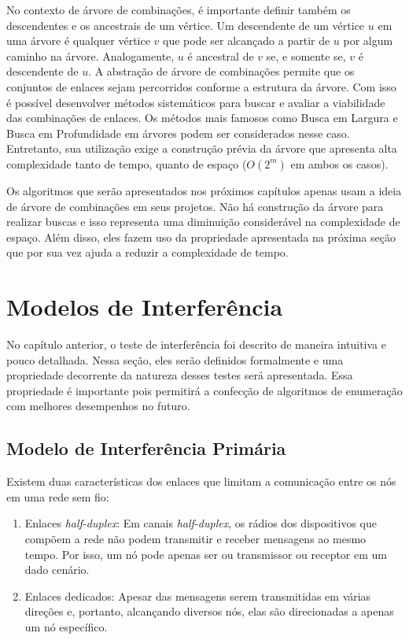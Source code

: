 

No contexto de árvore de combinações, é importante definir também os descendentes e os ancestrais de um vértice. Um descendente de um vértice $u$ em uma árvore é qualquer vértice $v$ que pode ser alcançado a partir de $u$ por algum caminho na árvore. Analogamente, $u$ é ancestral de $v$ se, e somente se, $v$ é descendente de $u$. 
A abstração de árvore de combinações permite que os conjuntos de enlaces sejam percorridos conforme a estrutura da árvore. Com isso é possível desenvolver métodos sistemáticos para buscar e avaliar a viabilidade das combinações de enlaces. Os métodos mais famosos como Busca em Largura e Busca em Profundidade em árvores podem ser considerados nesse caso. Entretanto, sua utilização exige a construção prévia da árvore que apresenta alta complexidade tanto de tempo, quanto de espaço ($O(2^m)$ em ambos os casos).

Os algoritmos que serão apresentados nos próximos capítulos apenas usam a ideia de árvore de combinações em seus projetos. Não há construção da árvore para realizar buscas e isso representa uma diminuição considerável na complexidade de espaço. Além disso, eles fazem uso da propriedade apresentada na próxima seção que por sua vez ajuda a reduzir a complexidade de tempo.


\section{Modelos de Interferência}

No capítulo anterior, o teste de interferência foi descrito de maneira intuitiva e pouco detalhada. Nessa seção, eles serão definidos formalmente e uma propriedade decorrente da natureza desses testes será apresentada. Essa propriedade é importante pois permitirá a confecção de algoritmos de enumeração com melhores desempenhos no futuro. 

\subsection{Modelo de Interferência Primária}

Existem duas características dos enlaces que limitam a comunicação entre os nós em uma rede sem fio: 


\begin{enumerate}

\item Enlaces {\it half-duplex}: Em canais {\it half-duplex}, os rádios dos dispositivos que compõem a rede não podem transmitir e receber mensagens ao mesmo tempo. Por isso, um nó pode apenas ser ou transmissor ou receptor em um dado cenário.
 
\item Enlaces dedicados: Apesar das mensagens serem transmitidas em várias direções e, portanto, alcançando diversos nós, elas são direcionadas a apenas um nó específico. 
\end{enumerate}

